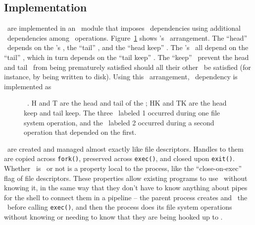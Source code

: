 
\subsection{Implementation}
\label{sec:opgroup:implementation}

\Opgroups\ are implemented in an \LFS\ module that imposes \opgroup\
dependencies using additional \chdesc\ dependencies among \LFS\
operations.
%
Figure~\ref{fig:opgroup-chdescs} shows \anopgroup's \chdesc\ arrangement.
%
The ``head'' \chdesc\ depends on the \opgroup's \chdescs, the ``tail''
\chdesc, and the ``head keep'' \chdesc.
%
The \opgroup's \chdescs\ all depend on the ``tail'' \chdesc, which in
turn depends on the ``tail keep'' \chdesc.
%
The ``keep'' \chdescs\ prevent the head and tail \chdescs\ from being
prematurely satisfied should all their other \befores\ be satisfied
(for instance, by being written to disk).
%
Using this \chdesc\ arrangement, \anopgroup\ dependency 
is implemented as 

\begin{figure}[htb]
\caption{\label{fig:opgroup-chdescs} \Opgroup\ \chdescs. H and T are the head
and tail of the \opgroup; HK and TK are the head keep and tail keep. The three
\chdescs\ labeled 1 occurred during one file system operation, and the \chdesc\
labeled 2 occurred during a second operation that depended on the first.}
\end{figure}

\Opgroups\ are created and managed almost exactly like file descriptors. Handles
to them are copied across \texttt{fork()}, preserved across \texttt{exec()}, and
closed upon \texttt{exit()}. Whether \anopgroup\ is \engaged\ or not is a
property local to the process, like the ``close-on-exec'' flag of file
descriptors. These properties allow existing programs to use \opgroups\ without
knowing it, in the same way that they don't have to know anything about pipes
for the shell to connect them in a pipeline -- the parent process creates and
\engages\ the \opgroups\ before calling \texttt{exec()}, and then the process
does its file system operations without knowing or needing to know that they are
being hooked up to \anopgroup.

